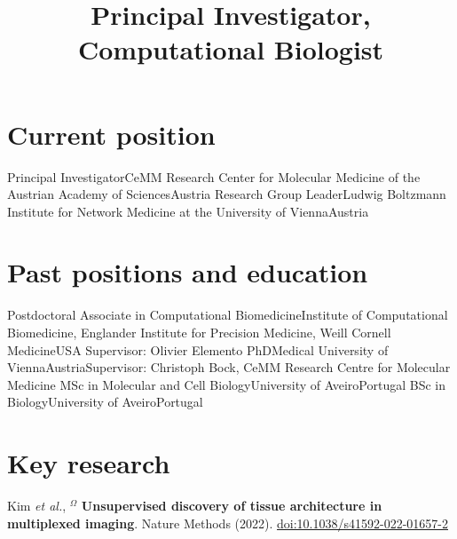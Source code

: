\documentclass[11pt,a4paper,roman]{moderncv} %
\title{Principal Investigator, \newline Computational Biologist}
\begin{document}
\makecvtitle %


\section{Current position}
        {Principal Investigator}{\newline{}CeMM Research Center for Molecular Medicine of the Austrian Academy of Sciences}{Austria}
        {}{}
        {Research Group Leader}{\newline{}Ludwig Boltzmann Institute for Network Medicine at the University of Vienna}{Austria}
        {}{}



\section{Past positions and education}
        {Postdoctoral Associate in Computational Biomedicine}{Institute of Computational Biomedicine, Englander Institute for Precision Medicine, Weill Cornell Medicine}{USA}
        {}{Supervisor: Olivier Elemento}
        {PhD}{Medical University of Vienna}{Austria}{}{Supervisor: Christoph Bock, CeMM Research Centre for Molecular Medicine}
        {MSc in Molecular and Cell Biology}{University of Aveiro}{Portugal}{}{}
        {BSc in Biology}{University of Aveiro}{Portugal}{}{}




\section{Key research}
        {Kim \textit{et al.}, $^\Omega$ \textbf{Unsupervised discovery of tissue architecture in multiplexed imaging}. Nature Methods (2022). \href{https://doi.org/10.1038/s41592-022-01657-2}{doi:10.1038/s41592-022-01657-2}}
\end{document}
